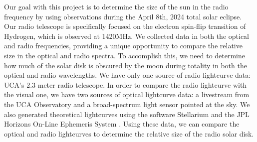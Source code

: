 Our goal with this project is to determine the size of the sun in the radio frequency by using observations during the April 8th, 2024 total solar eclipse.
Our radio telescope is specifically focused on the electron spin-flip transition of Hydrogen, which is observed at 1420MHz.
We collected data in both the optical and radio frequencies, providing a unique opportunity to compare the relative size in the optical and radio spectra.
To accomplish this, we need to determine how much of the solar disk is obscured by the moon during totality in both the optical and radio wavelengths.
We have only one source of radio lightcurve data: UCA's 2.3 meter radio telescope.
In order to compare the radio lightcurve with the visual one, we have two sources of optical lightcurve data: a livestream from the UCA Observatory and a broad-spectrum light sensor pointed at the sky.
We also generated theoretical lightcurves using the software Stellarium \cite{zotti_simulated_2020} and the JPL Horizons On-Line Ephemeris System \cite{nasa_jpl_solar_system_dynamics_group_jpl_nodate}.
Using these data, we can compare the optical and radio lightcurves to determine the relative size of the radio solar disk.
